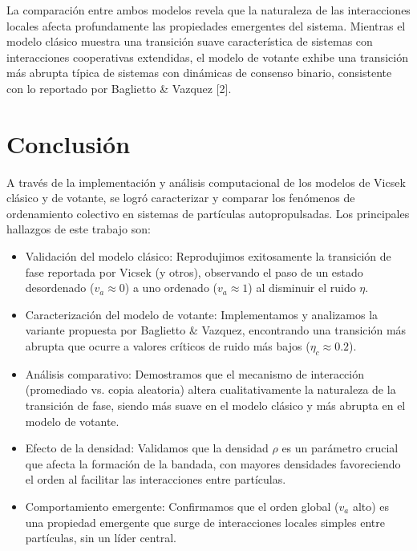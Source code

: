 \documentclass{article}
\begin{document}
La comparación entre ambos modelos revela que la naturaleza de las interacciones locales afecta profundamente las propiedades emergentes del sistema. Mientras el modelo clásico muestra una transición suave característica de sistemas con interacciones cooperativas extendidas, el modelo de votante exhibe una transición más abrupta típica de sistemas con dinámicas de consenso binario, consistente con lo reportado por Baglietto \& Vazquez [2].

\section{Conclusión}
A través de la implementación y análisis computacional de los modelos de Vicsek clásico y de votante, se logró caracterizar y comparar los fenómenos de ordenamiento colectivo en sistemas de partículas autopropulsadas. Los principales hallazgos de este trabajo son:

\begin{itemize}
    \item  Validación del modelo clásico: Reprodujimos exitosamente la transición de fase reportada por Vicsek (y otros), observando el paso de un estado desordenado ($v_a \approx 0$) a uno ordenado ($v_a \approx 1$) al disminuir el ruido $\eta$.

    \item Caracterización del modelo de votante: Implementamos y analizamos la variante propuesta por Baglietto \& Vazquez, encontrando una transición más abrupta que ocurre a valores críticos de ruido más bajos ($\eta_c \approx 0.2$).

    \item  Análisis comparativo: Demostramos que el mecanismo de interacción (promediado vs. copia aleatoria) altera cualitativamente la naturaleza de la transición de fase, siendo más suave en el modelo clásico y más abrupta en el modelo de votante.

    \item  Efecto de la densidad: Validamos que la densidad $\rho$ es un parámetro crucial que afecta la formación de la bandada, con mayores densidades favoreciendo el orden al facilitar las interacciones entre partículas.

    \item  Comportamiento emergente: Confirmamos que el orden global ($v_a$ alto) es una propiedad emergente que surge de interacciones locales simples entre partículas, sin un líder central.
\end{itemize}
\end{document}

